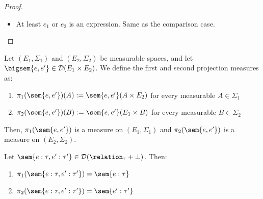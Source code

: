\begin{proof}
\begin{itemize}
		Thus,
		\[
			\sem{\uniform(v,w) : \tau, \discrete(p_0',\ldots,p_{|B|}) : \discretize{\tau}} \in \mathcal{D}(\relation_{\float} + \bot),
		\]
		for which we proved in the above case.
		
		\item At least $e_1$ or $e_2$ is an expression. Same as the comparison case.
	\end{itemize}
\end{proof}

\begin{definition}
	Let $(E_1, \Sigma_1)$ and $(E_2, \Sigma_2)$ be measurable spaces, and let $\bigsem{e,e'} \in \mathcal{D}(E_1 \times E_2)$. We define the first and second projection measures as:
	\begin{enumerate}
		\item $\pi_1(\sem{e,e'})(A) := \sem{e,e'}(A \times E_2)$ for every measurable $A \in \Sigma_1$
		\item $\pi_2(\sem{e,e'})(B) := \sem{e,e'}(E_1 \times B)$ for every measurable $B \in \Sigma_2$
	\end{enumerate}
	Then, $\pi_1(\sem{e,e'})$ is a measure on $(E_1, \Sigma_1)$ and $\pi_2(\sem{e,e'})$ is a measure on $(E_2, \Sigma_2)$.
\end{definition}

\begin{lemma}\label{lem:small-step-proj}
	Let $\sem{e : \tau, e' : \tau'} \in \mathcal{D}(\relation_{\tau} + \bot)$. Then:
	\begin{enumerate}
		\item $\pi_1(\sem{e : \tau, e' : \tau'}) = \sem{e : \tau}$
		\item $\pi_2(\sem{e : \tau, e' : \tau'}) = \sem{e' : \tau'}$
	\end{enumerate}
\end{lemma}

